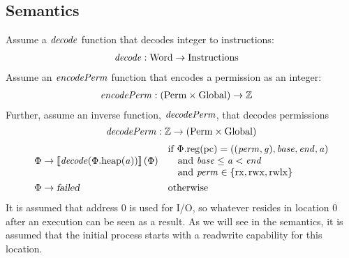 \documentclass{article}
\newcommand{\sem}[1]{\left\llbracket #1 \right\rrbracket}
\newcommand{\fun}{\rightarrow}
\newcommand{\var}[1]{\mathit{#1}}
\newcommand{\gl}{\var{g}}
\newcommand{\pcreg}{\mathrm{pc}}
\newcommand{\addr}{\var{a}}
\newcommand{\start}{\var{base}}
\newcommand{\addrend}{\var{end}}
\newcommand{\perm}{\var{perm}}
\newcommand{\stdcap}[1][(\perm,\gl)]{\left(#1,\start,\addrend,\addr \right)}
\newcommand{\plainproj}[1]{\mathrm{#1}}
\newcommand{\memheap}[1][\Phi]{#1.\plainproj{heap}}
\newcommand{\memreg}[1][\Phi]{#1.\plainproj{reg}}
\newcommand{\failed}{\textsl{failed}}
\newcommand{\plainfun}[2]{
  \ifthenelse{\equal{#2}{}}
             {\mathit{#1}}
             {\mathit{#1}(#2)}
}
\newcommand{\decode}{\plainfun{decode}{}}
\newcommand{\encodePerm}{\plainfun{encodePerm}{}}
\newcommand{\decodePerm}{\plainfun{decodePerm}{}}
\newcommand{\plaindom}[1]{\mathrm{#1}}
\newcommand{\Words}{\plaindom{Word}}
\newcommand{\Instrs}{\plaindom{Instructions}}
\newcommand{\ints}{\mathbb{Z}}
\newcommand{\Perms}{\plaindom{Perm}}
\newcommand{\Globals}{\plaindom{Global}}
\newcommand{\plainperm}[1]{\mathrm{#1}}
\newcommand{\exec}{\plainperm{rx}}
\newcommand{\rwx}{\plainperm{rwx}}
\newcommand{\rwlx}{\plainperm{rwlx}}
\begin{document}
\subsection*{Semantics}
Assume a $\decode$ function that decodes integer to instructions:
\begin{align*}
\decode &:\Words \fun \Instrs
\end{align*}
Assume an $\encodePerm$ function that encodes a permission as an integer:
\begin{align*}
\encodePerm &: (\Perms \times \Globals) \fun \ints
\end{align*}
Further, assume an inverse function, $\decodePerm$, that decodes permissions
\[
  \decodePerm : \ints \fun (\Perms \times \Globals)
\]
\begin{align*}
  \Phi & \rightarrow \sem{\decode(\memheap(\addr))}(\Phi) & &                                   
                                                              \arraycolsep=0pt
                                                              \begin{array}{l}
                                                                \text{if $\memreg(\pcreg) = \stdcap$}\\
                                                                \quad\text{and $\start \leq \addr < \addrend$}\\
                                                                \quad\text{and $\perm \in \{ \exec,\rwx, \rwlx \}$ }
                                                              \end{array}\\
\Phi & \rightarrow \failed                                 & & \text{otherwise}
\end{align*}
It is assumed that address 0 is used for I/O, so whatever resides in location 0 after an execution can be seen as a result. As we will see in the semantics, it is assumed that the initial process starts with a readwrite capability for this location.
\end{document}
